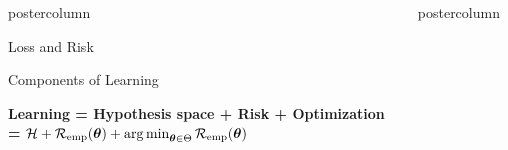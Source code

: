 \documentclass{beamer}
\newlength{\columnheight} %
\begin{document}
\begin{frame}[fragile]{}
\begin{columns}
\begin{column}{.31\textwidth}
\begin{beamercolorbox}[center]{postercolumn}
\begin{minipage}{.98\textwidth}
{\begin{myblock}{Loss and Risk}
\end{myblock}
\begin{myblock}{Components of Learning}

\textbf{Learning = Hypothesis space + Risk + Optimization} \\
 \textbf{= }$ \mathcal{H} + \mathcal{R}_{\text{emp}}(\bm{\theta}) + \operatorname{arg\,min}_{\bm{\theta} \in \Theta} 
\mathcal{R}_{\text{emp}}(\bm{\theta})$

% 
% 
% 
% 
% 
% 
% 
% 
% 


\end{myblock}




				}
			\end{minipage}
		\end{beamercolorbox}
	\end{column}
	\begin{column}{.31\textwidth}
		\begin{beamercolorbox}[center]{postercolumn}
			\begin{minipage}{.98\textwidth}
				\parbox[t][\columnheight]{\textwidth}{


}
\end{minipage}
\end{beamercolorbox}
\end{column}
\end{columns}
\end{frame}
\end{document}
